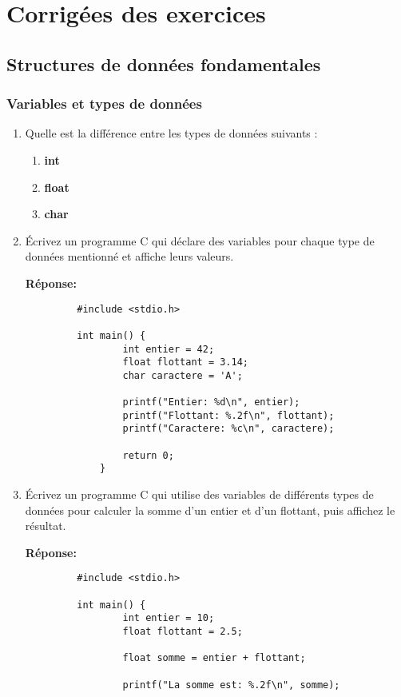 \chapter{Corrig\'ees des exercices}
\section{Structures de données fondamentales}

\subsection{Variables et types de données}
\begin{enumerate}
	\item Quelle est la différence entre les types de données suivants :
	\begin{enumerate}
		\item \textbf{int}
		\item \textbf{float}
		\item \textbf{char}
	\end{enumerate}
	
	\item Écrivez un programme C qui déclare des variables pour chaque type de données mentionné et affiche leurs valeurs.
	
	 \textbf{Réponse:}
	 \begin{lstlisting}
		 #include <stdio.h>
		
		 int main() {
			     int entier = 42; 
			     float flottant = 3.14; 
			     char caractere = 'A'; 
			
			     printf("Entier: %d\n", entier);
			     printf("Flottant: %.2f\n", flottant);
			     printf("Caractere: %c\n", caractere);
			
			     return 0;
			 }
		 \end{lstlisting}
	
	\item Écrivez un programme C qui utilise des variables de différents types de données pour calculer la somme d'un entier et d'un flottant, puis affichez le résultat.
	
	 \textbf{Réponse:}
	 \begin{lstlisting}
		 #include <stdio.h>
		
		 int main() {
			     int entier = 10;
			     float flottant = 2.5;
			
			     float somme = entier + flottant; 
			
			     printf("La somme est: %.2f\n", somme);
			

\end{lstlisting}
\end{enumerate}
